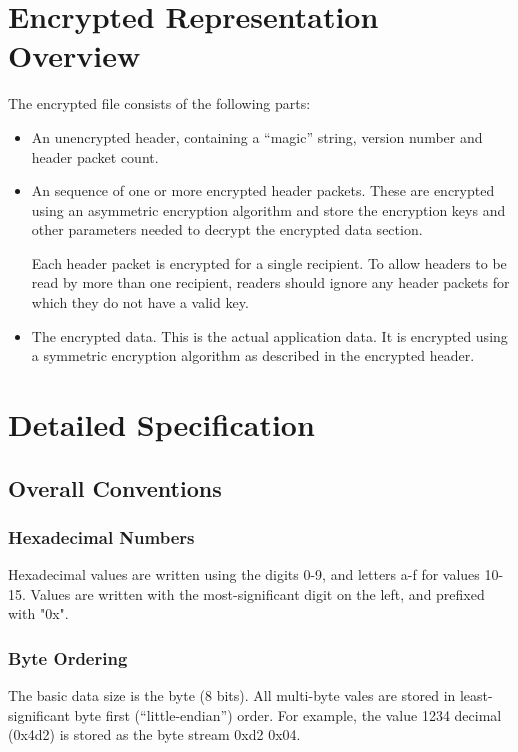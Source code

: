 \documentclass[10pt]{article}
\begin{document}
\section{Encrypted Representation Overview}
The encrypted file consists of the following parts:

\begin{itemize}
\item An unencrypted header, containing a ``magic'' string, version number and header packet count.

\item An sequence of one or more encrypted header packets.
These are encrypted using an asymmetric encryption algorithm and store the encryption keys and other parameters needed
to decrypt the encrypted data section.

Each header packet is encrypted for a single recipient.
To allow headers to be read by more than one recipient, readers should ignore any header packets for which they
do not have a valid key.

\item The encrypted data.
This is the actual application data.
It is encrypted using a symmetric encryption algorithm as described in the encrypted header.
\end{itemize}

\section{Detailed Specification}
\subsection{Overall Conventions}
\subsubsection{Hexadecimal Numbers}
Hexadecimal values are written using the digits 0-9, and letters a-f for values 10-15.
Values are written with the most-significant digit on the left, and prefixed with "0x".

\subsubsection{Byte Ordering}
The basic data size is the byte (8 bits).
All multi-byte vales are stored in least-significant byte first (``little-endian'') order.
For example, the value 1234 decimal (0x4d2) is stored as the byte stream 0xd2 0x04.
\end{document}
